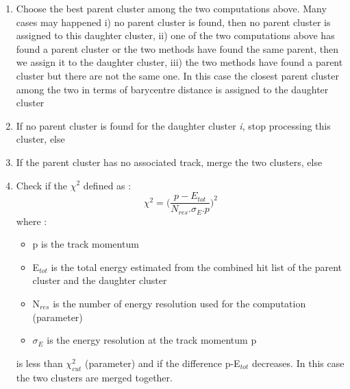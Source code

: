 \documentclass[cits]{JINST}
\begin{document}
\begin{enumerate}
  \item Choose the best parent cluster among the two computations above. Many cases may happened i) no parent cluster is found, then no parent cluster is assigned to this daughter cluster, ii) one of the two computations above has found a parent cluster or the two methods have found the same parent, then we assign it to the daughter cluster, iii) the two methods have found a parent cluster but there are not the same one. In this case the closest parent cluster among the two in terms of barycentre distance is assigned to the daughter cluster
  \item If no parent cluster is found for the daughter cluster \textit{i}, stop processing this cluster, else
  \item If the parent cluster has no associated track, merge the two clusters, else
  \item Check if the $\chi^2$ defined as :
  \begin{equation}
    \label{CHI2_ALGORITHM_EQUATION}
    \chi^2 = \Big( \frac{p-E_{tot}}{N_{res} . \sigma_E . p} \Big)^2
  \end{equation}
  where :
  \begin{itemize}
    \item p is the track momentum
    \item E$_{tot}$ is the total energy estimated from the combined hit list of the parent cluster and the daughter cluster
    \item N$_{res}$ is the number of energy resolution used for the computation (parameter)
    \item $\sigma_E$ is the energy resolution at the track momentum p 
  \end{itemize}
  is less than $\chi^2_{cut}$ (parameter) and if the difference p-E$_{tot}$ decreases. In this case the two clusters are merged together.
\end{enumerate}
\end{document}
